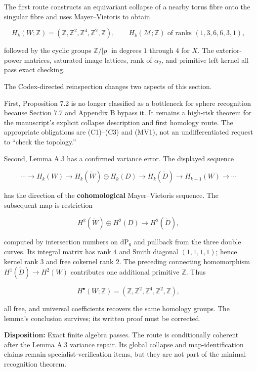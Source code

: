 \documentclass[
  10pt,
  letterpaper,
]{article}
\newcommand{\Z}{\mathbb Z}
\begin{document}
The first route constructs an equivariant collapse of a nearby torus
fibre onto the singular fibre and uses Mayer--Vietoris to obtain

\[
H_k(W;\Z)=(\Z,\Z^2,\Z^4,\Z^2,\Z),
\qquad
H_k(\mathcal M;\Z)\text{ of ranks }(1,3,6,6,3,1),
\]

followed by the cyclic groups \(\mathbb Z/|p|\) in degrees \(1\) through
\(4\) for \(X\). The exterior-power matrices, saturated image lattices,
rank of \(\alpha_2\), and primitive left kernel all pass exact checking.

The Codex-directed reinspection changes two aspects of this section.

First, Proposition 7.2 is no longer classified as a bottleneck for
sphere recognition because Section 7.7 and Appendix B bypass it. It
remains a high-risk theorem for the manuscript's explicit collapse
description and first homology route. The appropriate obligations are
(C1)--(C3) and (MV1), not an undifferentiated request to ``check the
topology.''

Second, Lemma A.3 has a confirmed variance error. The displayed sequence

\[
\cdots\to H_k(W)\to H_k(\widetilde W)\oplus H_k(D)
\to H_k(\widetilde D)\to H_{k+1}(W)\to\cdots
\]

has the direction of the \textbf{cohomological} Mayer--Vietoris
sequence. The subsequent map is restriction

\[
H^2(\widetilde W)\oplus H^2(D)\longrightarrow H^2(\widetilde D),
\]

computed by intersection numbers on \(\mathrm{dP}_6\) and pullback from
the three double curves. Its integral matrix has rank \(4\) and Smith
diagonal \((1,1,1,1)\); hence kernel rank \(3\) and free cokernel rank
\(2\). The preceding connecting homomorphism
\(H^1(\widetilde D)\to H^2(W)\) contributes one additional primitive
\(\mathbb Z\). Thus

\[
H^\bullet(W;\mathbb Z)=(\mathbb Z,\mathbb Z^2,\mathbb Z^4,\mathbb Z^2,\mathbb Z),
\]

all free, and universal coefficients recovers the same homology groups.
The lemma's conclusion survives; its written proof must be corrected.

\textbf{Disposition:} Exact finite algebra passes. The route is
conditionally coherent after the Lemma A.3 variance repair. Its global
collapse and map-identification claims remain specialist-verification
items, but they are not part of the minimal recognition theorem.
\end{document}
